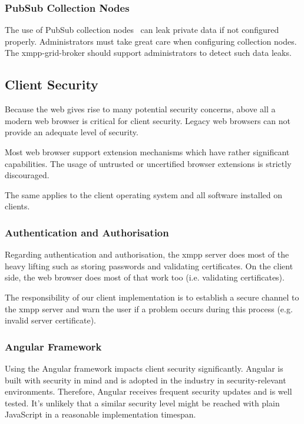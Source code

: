 \subsubsection{PubSub Collection Nodes}

The use of PubSub collection nodes~\cite{xep-0248} can leak private data if not configured properly.
Administrators must take great care when configuring collection nodes.
The \gls{xmpp-grid-broker} should support administrators to detect such data leaks.

\subsection{Client Security}

Because the web gives rise to many potential security concerns, above all a modern web browser is critical for client security.
Legacy web browsers can not provide an adequate level of security.~\cite{firefox-update-security}

Most web browser support extension mechanisms which have rather significant capabilities.
The usage of untrusted or uncertified browser extensions is strictly discouraged.~\cite{browser-extension-security}

The same applies to the client operating system and all software installed on clients.

\subsubsection{Authentication and Authorisation}

Regarding authentication and authorisation, the \gls{xmpp} server does most of the heavy lifting such as storing passwords and validating certificates.
On the client side, the web browser does most of that work too (i.e. validating certificates).

The responsibility of our client implementation is to establish a secure channel to the \gls{xmpp} server and warn the user if a problem occurs during this process (e.g. invalid server certificate).

\subsubsection{Angular Framework}

Using the Angular framework impacts client security significantly.
Angular is built with security in mind and is adopted in the industry in security-relevant environments.
Therefore, Angular receives frequent security updates and is well tested.
It's unlikely that a similar security level might be reached with plain JavaScript in a reasonable implementation timespan.

